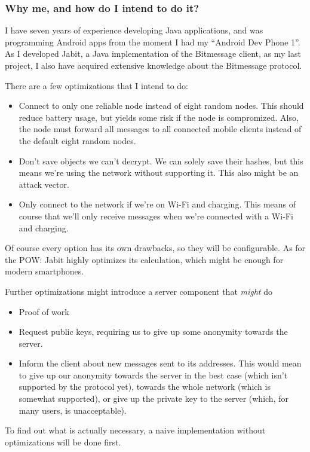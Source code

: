 \documentclass{bfh}
\begin{document}
  \subsubsection{Why me, and how do I intend to do it?}
  I have seven years of experience developing Java applications, and was programming Android apps from the moment I had my ``Android Dev Phone 1''. As I developed Jabit, a Java implementation of the Bitmessage client, as my last project, I also have acquired extensive knowledge about the Bitmessage protocol.

  There are a few optimizations that I intend to do:
  \begin{itemize}
    \item Connect to only one reliable node instead of eight random nodes. This should reduce battery usage, but yields some risk if the node is compromized. Also, the node must forward all messages to all connected mobile clients instead of the default eight random nodes.
    \item Don't save objects we can't decrypt. We can solely save their hashes, but this means we're using the network without supporting it. This also might be an attack vector.
    \item Only connect to the network if we're on Wi-Fi and charging. This means of course that we'll only receive messages when we're connected with a Wi-Fi and charging.
  \end{itemize}
  Of course every option has its own drawbacks, so they will be configurable. As for the \ac{POW}: Jabit highly optimizes its calculation, which might be enough for modern smartphones.

  Further optimizations might introduce a server component that \textit{might} do
  \begin{itemize}
    \item Proof of work
    \item Request public keys, requiring us to give up some anonymity towards the server.
    \item Inform the client about new messages sent to its addresses. This would mean to give up our anonymity towards the server in the best case (which isn't supported by the protocol yet), towards the whole network (which is somewhat supported), or give up the private key to the server (which, for many users, is unacceptable).
  \end{itemize}

  To find out what is actually necessary, a naive implementation without optimizations will be done first.
\end{document}
